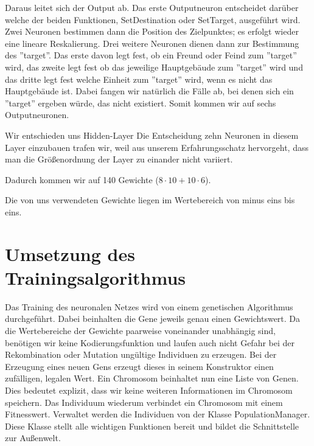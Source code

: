 \documentclass[
	12pt,
	a4paper,
	BCOR10mm,
	DIV14,
	headsepline,
	usegeometry,
]{scrreprt}
\begin{document}
Daraus leitet sich der Output ab.
Das erste Outputneuron  entscheidet darüber welche der beiden Funktionen, SetDestination oder SetTarget, ausgeführt wird.
Zwei Neuronen  bestimmen dann die Position des Zielpunktes; es erfolgt wieder eine lineare Reskalierung.
Drei weitere Neuronen dienen dann zur Bestimmung des ''target''.
Das erste davon  legt fest, ob ein Freund oder Feind zum ''target'' wird, das zweite  legt fest ob das jeweilige Hauptgebäude zum ''target'' wird und das dritte  legt fest welche Einheit zum ''target'' wird, wenn es nicht das Hauptgebäude ist.
Dabei fangen wir natürlich die Fälle ab, bei denen sich ein ''target'' ergeben würde, das nicht existiert.
Somit kommen wir auf sechs Outputneuronen.

Wir entschieden uns  Hidden-Layer 
Die Entscheidung zehn Neuronen in diesem Layer einzubauen trafen wir, weil aus unserem Erfahrungsschatz hervorgeht, dass man die Größenordnung der Layer zu einander nicht variiert.

Dadurch kommen wir auf 140 Gewichte ($8 \cdot 10 + 10 \cdot 6$).

Die von uns verwendeten Gewichte liegen im Wertebereich von minus eins bis eins.

\section{Umsetzung des Trainingsalgorithmus}
Das Training des neuronalen Netzes wird von einem genetischen Algorithmus durchgeführt.
Dabei beinhalten die Gene jeweils genau einen Gewichtswert.
Da die Wertebereiche der Gewichte paarweise voneinander unabhängig sind, benötigen wir keine Kodierungsfunktion und laufen auch nicht Gefahr bei der Rekombination oder Mutation ungültige Individuen zu erzeugen.
Bei der Erzeugung eines neuen Gens erzeugt dieses in seinem Konstruktor einen zufälligen, legalen Wert.
Ein Chromosom beinhaltet nun eine Liste von Genen.
Dies bedeutet explizit, dass wir keine weiteren Informationen im Chromosom speichern.
Das Individuum wiederum verbindet ein Chromosom mit einem Fitnesswert.
Verwaltet werden die Individuen von der Klasse PopulationManager.
Diese Klasse stellt alle wichtigen Funktionen bereit und bildet die Schnittstelle zur Außenwelt.
\end{document}
